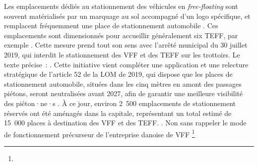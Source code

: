 \begin{refsegment}
{    Les emplacements dédiés au stationnement des véhicules en \textsl{free-floating} sont souvent matérialisés par un marquage au sol accompagné d’un logo spécifique, et remplacent fréquemment une place de stationnement automobile \textcolor{blue}{\autocite{livonniere_trottinettes_2019}}. Ces emplacements sont dimensionnés pour accueillir généralement six \acrshort{TEFF}, par exemple \textcolor{blue}{\autocite{burban_trottinettes_2019}}. Cette mesure prend tout son sens avec l’arrêté municipal du 30 juillet 2019, qui interdit le stationnement des \acrshort{VFF} et des \acrshort{TEFF} sur les trottoirs. Le texte précise~:  \textcolor{blue}{\autocite[3~151]{ville_de_paris_bulletin_2019}}. Cette initiative vient compléter une application et une relecture stratégique de l’article 52 de la \acrfull{LOM} de 2019, qui dispose que les places de stationnement automobile, situées dans les cinq mètres en amont des passages piétons, seront neutralisées avant 2027, afin de garantir une meilleure visibilité des piéton·ne·s \textcolor{blue}{\autocite[42]{gart_loi_2020}}. À ce jour, environ 2~500 emplacements de stationnement réservés ont été aménagés dans la capitale, représentant un total estimé de 15~000 places à destination des \acrshort{VFF} et des \acrshort{TEFF}.
} \textcolor{blue}{\autocites[3~151]{ville_de_paris_bulletin_2019}[90]{6t-bureau_de_recherche_livre_2019}}. Non sans rappeler le mode de fonctionnement précurseur de l'entreprise danoise de \acrshort{VFF} \footnote{
}
\end{refsegment}

